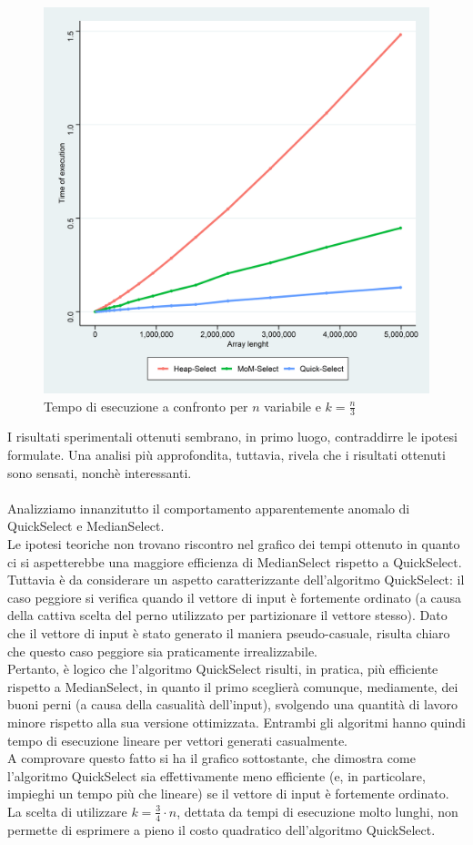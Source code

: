 \documentclass{article}
\begin{document}
	\begin{figure}[h!]
		\centering
  		\includegraphics[width=0.9	\columnwidth]{images/All_Basic_Times.png}
  		\caption{Tempo di esecuzione a confronto per $n$ variabile e $k=\frac{n}{3}$}
  		\label{fig:graph1}
	\end{figure}	
	
	I risultati sperimentali ottenuti sembrano, in primo luogo, contraddirre le ipotesi formulate. Una analisi più approfondita, tuttavia, rivela che i risultati ottenuti sono sensati, nonchè interessanti. 
	\\\\
	Analizziamo innanzitutto il comportamento apparentemente anomalo di QuickSelect e MedianSelect.
	\\
	Le ipotesi teoriche non trovano riscontro nel grafico dei tempi ottenuto in quanto ci si aspetterebbe una maggiore efficienza di MedianSelect rispetto a QuickSelect. Tuttavia è da considerare un aspetto caratterizzante dell'algoritmo QuickSelect: il caso peggiore si verifica quando il vettore di input è fortemente ordinato (a causa della cattiva scelta del perno utilizzato per partizionare il vettore stesso). Dato che il vettore di input è stato generato il maniera pseudo-casuale, risulta chiaro che questo caso peggiore sia praticamente irrealizzabile. 
	\\
	Pertanto, è logico che l'algoritmo QuickSelect risulti, in pratica, più efficiente rispetto a MedianSelect, in quanto il primo sceglierà comunque, mediamente, dei buoni perni (a causa della casualità dell'input), svolgendo una quantità di lavoro minore rispetto alla sua versione ottimizzata. Entrambi gli algoritmi hanno quindi tempo di esecuzione lineare per vettori generati casualmente. 
	\\ 
	A comprovare questo fatto si ha il grafico sottostante, che dimostra come l'algoritmo QuickSelect sia effettivamente meno efficiente (e, in particolare, impieghi un tempo più che lineare) se il vettore di input è fortemente ordinato. La scelta di utilizzare $k=\frac{3}{4}\cdot n$, dettata da tempi di esecuzione molto lunghi, non permette di esprimere a pieno il costo quadratico dell'algoritmo QuickSelect.
	
\end{document}
